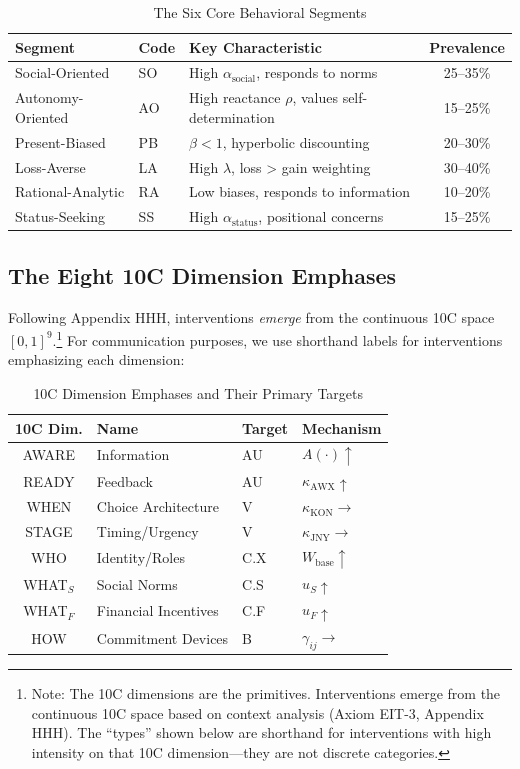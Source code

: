 \begin{table}[htbp]
\centering
\caption{The Six Core Behavioral Segments}
\label{tab:qq-segments}
\renewcommand{\arraystretch}{1.4}
\begin{tabular}{@{}llp{5cm}c@{}}
\toprule
\textbf{Segment} & \textbf{Code} & \textbf{Key Characteristic} & \textbf{Prevalence} \\
\midrule
Social-Oriented & SO & High $\alpha_{\text{social}}$, responds to norms & 25--35\% \\
Autonomy-Oriented & AO & High reactance $\rho$, values self-determination & 15--25\% \\
Present-Biased & PB & $\beta < 1$, hyperbolic discounting & 20--30\% \\
Loss-Averse & LA & High $\lambda$, loss > gain weighting & 30--40\% \\
Rational-Analytic & RA & Low biases, responds to information & 10--20\% \\
Status-Seeking & SS & High $\alpha_{\text{status}}$, positional concerns & 15--25\% \\
\bottomrule
\end{tabular}
\end{table}

\subsection{The Eight 10C Dimension Emphases}

Following Appendix HHH, interventions \textit{emerge} from the continuous 10C space $[0,1]^9$.\footnote{Note: The 10C dimensions are the primitives. Interventions emerge from the continuous 10C space based on context analysis (Axiom EIT-3, Appendix HHH). The ``types'' shown below are shorthand for interventions with high intensity on that 10C dimension---they are not discrete categories.} For communication purposes, we use shorthand labels for interventions emphasizing each dimension:

\begin{table}[htbp]
\centering
\caption{10C Dimension Emphases and Their Primary Targets}
\label{tab:qq-types}
\renewcommand{\arraystretch}{1.3}
\begin{tabular}{@{}clll@{}}
\toprule
\textbf{10C Dim.} & \textbf{Name} & \textbf{Target} & \textbf{Mechanism} \\
\midrule
AWARE & Information & AU & $A(\cdot) \uparrow$ \\
READY & Feedback & AU & $\kappa_{\text{AWX}} \uparrow$ \\
WHEN & Choice Architecture & V & $\kappa_{\text{KON}} \rightarrow$ \\
STAGE & Timing/Urgency & V & $\kappa_{\text{JNY}} \rightarrow$ \\
WHO & Identity/Roles & C.X & $W_{\text{base}} \uparrow$ \\
WHAT$_S$ & Social Norms & C.S & $u_S \uparrow$ \\
WHAT$_F$ & Financial Incentives & C.F & $u_F \uparrow$ \\
HOW & Commitment Devices & B & $\gamma_{ij} \rightarrow$ \\
\bottomrule
\end{tabular}
\end{table}


